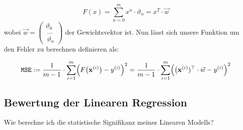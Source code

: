 \begin{equation}
	F(x) = \sum_{n=0}^{m} x^n \cdot \vartheta_n = x^T \cdot \vec{w}
\end{equation}
wobei $ \vec{w} = \begin{pmatrix}\vartheta_0 \\\ ... \\\ \vartheta_n \end{pmatrix}$ der Gewichtsvektor ist. Nun lässt sich unsere Funktion um den Fehler zu berechnen definieren als:

\begin{equation}
\label{eq:squared-error-1}
\mathtt{MSE} := \frac{1}{m-1} \cdot \sum\limits_{i=1}^{m} \Bigl(F\bigl(\mathbf{x}^{(i)}\bigr) - y^{(i)}\Bigr)^2=\frac{1}{m-1} \cdot \sum\limits_{i=1}^m \Bigl(\bigl(\mathbf{x}^{(i)})^\top \cdot \vec{w}  - y^{(i)}\Bigr)^2
\end{equation}

\subsection{Bewertung der Linearen Regression}
Wie berechne ich die statistische Signifikanz meines Linearen Modells?